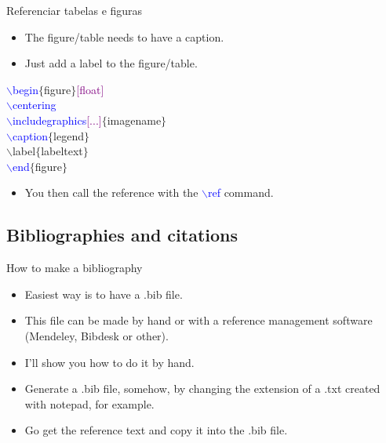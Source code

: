 \documentclass[usenames,dvipsnames,aspectratio=169]{beamer}
\newcommand{\aitem}{\item[$\cdot$]}
\begin{document}

\begin{frame}[t]{Referenciar tabelas e figuras}
\begin{itemize}
\aitem The figure/table needs to have a caption.
\aitem Just add a label to the figure/table.
\end{itemize}
\textcolor{blue}{$\backslash$begin}\textcolor{PineGreen}{$\{$figure$\}$}\textcolor{purple}{[float]}\\
\textcolor{blue}{$\backslash$centering}\\
\textcolor{blue}{$\backslash$includegraphics}\textcolor{purple}{[...]}\textcolor{PineGreen}{$\{$imagename$\}$}\\
\textcolor{blue}{$\backslash$caption}\textcolor{PineGreen}{$\{$legend$\}$}\\
\textcolor{YellowOrange}{$\backslash$label$\{$labeltext$\}$}\\
\textcolor{blue}{$\backslash$end}\textcolor{PineGreen}{$\{$figure$\}$}
\begin{itemize}
\aitem You then call the reference with the \textcolor{blue}{$\backslash$ref} command.
\end{itemize}
\end{frame}


%

\subsection{Bibliographies and citations}
\begin{frame}[t]{How to make a bibliography}
\begin{itemize}
\aitem Easiest way is to have a .bib file.
\aitem This file can be made by hand or with a reference management software (Mendeley, Bibdesk or other).
\aitem I'll show you how to do it by hand.
\aitem Generate a .bib file, somehow, by changing the extension of a .txt  created with notepad, for example.
\aitem Go get the reference text and copy it into the .bib file.
\end{itemize}
\end{frame}
\end{document}
